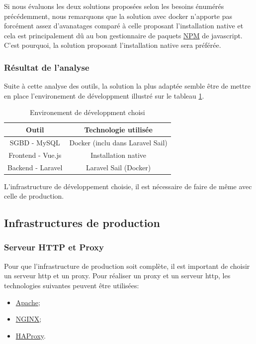 \documentclass[
    iai, %
    il, %
]{heig-tb}
\begin{document}
Si nous évaluons les deux solutions proposées selon les besoins énumérés précédemment, nous remarquons que  la solution avec \Gls{docker} n'apporte pas forcément assez d'avanatages comparé à
celle proposant l'installation native et cela est principalement dû au bon gestionnaire de paquets
\href{https://www.npmjs.com/}{NPM} de \Gls{javascript}. C'est pourquoi, la solution proposant
l'installation native sera préférée.

\subsubsection{Résultat de l'analyse}
Suite à cette analyse des outils, la solution la plus adaptée semble être de mettre en place
l'environement de développment illustré sur le tableau \ref{env-dev}.

\begin{table}[h]
    \begin{center}
        \caption{Environement de développment choisi \label{env-dev}}
        \begin{tabular}{c|c}
            Outil             & Technologie utilisée             \\ \hline
            SGBD - MySQL      & Docker (inclu dans Laravel Sail) \\
            Frontend - Vue.js & Installation native              \\
            Backend - Laravel & Laravel Sail (Docker)            \\
        \end{tabular}
    \end{center}
\end{table}

L'infrastructure de développement choisie, il est nécessaire de faire de même avec celle de production.

\clearpage
\subsection{Infrastructures de production}

\subsubsection{Serveur HTTP et Proxy}
Pour que l'infrastructure de production soit complète, il est important de choisir un serveur \Gls{http} et un \Gls{proxy}.
Pour réaliser un \Gls{proxy} et un serveur \Gls{http}, les technologies suivantes peuvent être utilisées:
\begin{itemize}
    \item \href{https://httpd.apache.org/}{Apache};
    \item \href{https://www.nginx.com/}{NGINX};
    \item \href{https://www.haproxy.org/}{HAProxy}.
\end{itemize}
\end{document}
